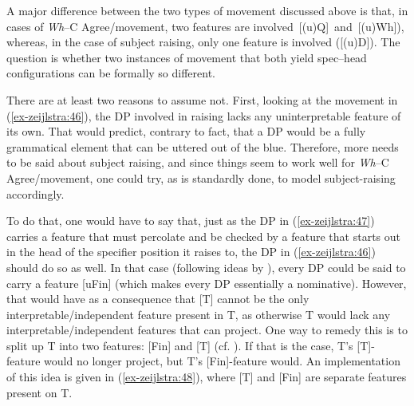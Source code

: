 \documentclass[output=paper
,modfonts
,nonflat]{langsci/langscibook}
\begin{document}
\begin{figure}[!h]
	\begin{exe}
	\end{exe} \vspace{-0.7cm}
\end{figure}

\noindent A major difference between the two types of movement discussed above is that, in cases of \textit{Wh}--C Agree/movement, two features are involved~[(u)Q]~and~[(u)Wh]), whereas, in the case of subject raising, only one feature is involved ([(u)D]). The question is whether two instances of movement that both yield spec–head configurations can be formally so different. 

There are at least two reasons to assume not. First, looking at the movement in (\ref{ex-zeijlstra:46}), the DP involved in raising lacks any uninterpretable feature of its own. That would predict, contrary to fact, that a DP would be a fully grammatical element that can be uttered out of the blue. Therefore, more needs to be said about subject raising, and since things seem to work well for \textit{Wh}–C Agree/movement, one could try, as is standardly done, to model subject-raising accordingly.

To do that, one would have to say that, just as the DP in (\ref{ex-zeijlstra:47}) carries a feature that must percolate and be checked by a feature that starts out in the head of the specifier position it raises to, the DP in (\ref{ex-zeijlstra:46}) should do so as well. In that case (following ideas by \citealt{Pesetsky_Torrego2004, Pesetsky_Torrego2007}), every DP could be said to carry a feature [uFin] (which makes every DP essentially a nominative). However, that would have as a consequence that [T] cannot be the only interpretable/independent feature present in T, as otherwise T would lack any interpretable/independent features that can project. One way to remedy this is to split up T into two features: [Fin] and [T] (cf. \citealt{Koeneman_Zeijlstra2017}). If that is the case, T’s [T]-feature would no longer project, but T’s [Fin]-feature would. An implementation of this idea is given in (\ref{ex-zeijlstra:48}), where [T] and [Fin] are separate features present on T. 
\end{document}
